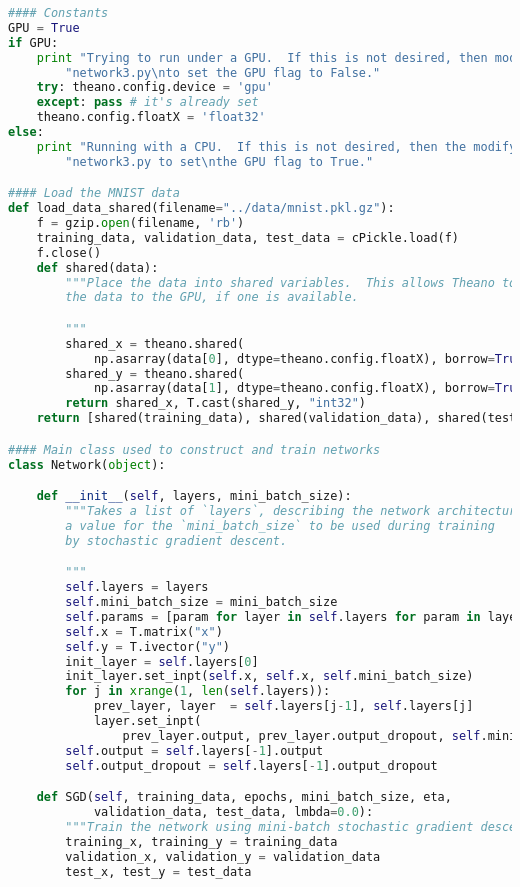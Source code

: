 \begin{lstlisting}[language=Python]
#### Constants
GPU = True
if GPU:
    print "Trying to run under a GPU.  If this is not desired, then modify "+\
        "network3.py\nto set the GPU flag to False."
    try: theano.config.device = 'gpu'
    except: pass # it's already set
    theano.config.floatX = 'float32'
else:
    print "Running with a CPU.  If this is not desired, then the modify "+\
        "network3.py to set\nthe GPU flag to True."

#### Load the MNIST data
def load_data_shared(filename="../data/mnist.pkl.gz"):
    f = gzip.open(filename, 'rb')
    training_data, validation_data, test_data = cPickle.load(f)
    f.close()
    def shared(data):
        """Place the data into shared variables.  This allows Theano to copy
        the data to the GPU, if one is available.

        """
        shared_x = theano.shared(
            np.asarray(data[0], dtype=theano.config.floatX), borrow=True)
        shared_y = theano.shared(
            np.asarray(data[1], dtype=theano.config.floatX), borrow=True)
        return shared_x, T.cast(shared_y, "int32")
    return [shared(training_data), shared(validation_data), shared(test_data)]

#### Main class used to construct and train networks
class Network(object):

    def __init__(self, layers, mini_batch_size):
        """Takes a list of `layers`, describing the network architecture, and
        a value for the `mini_batch_size` to be used during training
        by stochastic gradient descent.

        """
        self.layers = layers
        self.mini_batch_size = mini_batch_size
        self.params = [param for layer in self.layers for param in layer.params]
        self.x = T.matrix("x")
        self.y = T.ivector("y")
        init_layer = self.layers[0]
        init_layer.set_inpt(self.x, self.x, self.mini_batch_size)
        for j in xrange(1, len(self.layers)):
            prev_layer, layer  = self.layers[j-1], self.layers[j]
            layer.set_inpt(
                prev_layer.output, prev_layer.output_dropout, self.mini_batch_size)
        self.output = self.layers[-1].output
        self.output_dropout = self.layers[-1].output_dropout

    def SGD(self, training_data, epochs, mini_batch_size, eta,
            validation_data, test_data, lmbda=0.0):
        """Train the network using mini-batch stochastic gradient descent."""
        training_x, training_y = training_data
        validation_x, validation_y = validation_data
        test_x, test_y = test_data


\end{lstlisting}

